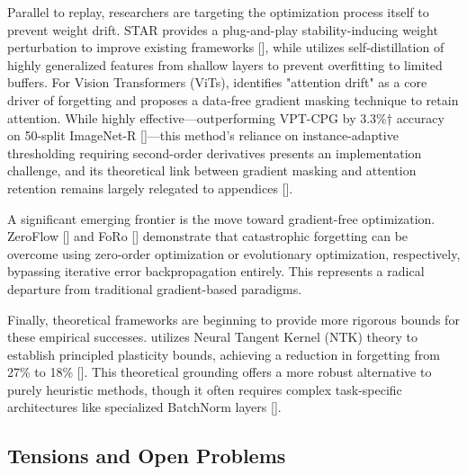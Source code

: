 \documentclass[11pt]{article}
\begin{document}
Parallel to replay, researchers are targeting the optimization process itself to prevent weight drift. STAR provides a plug-and-play stability-inducing weight perturbation to improve existing frameworks [\citep{2503.01595}], while \citep{2409.11329} utilizes self-distillation of highly generalized features from shallow layers to prevent overfitting to limited buffers. For Vision Transformers (ViTs), \citep{2602.05454} identifies "attention drift" as a core driver of forgetting and proposes a data-free gradient masking technique to retain attention. While highly effective—outperforming VPT-CPG by 3.3\%† accuracy on 50-split ImageNet-R [\citep{2602.05454}]—this method's reliance on instance-adaptive thresholding requiring second-order derivatives presents an implementation challenge, and its theoretical link between gradient masking and attention retention remains largely relegated to appendices [\citep{2602.05454}].

A significant emerging frontier is the move toward gradient-free optimization. ZeroFlow [\citep{2501.01045}] and FoRo [\citep{2509.01533}] demonstrate that catastrophic forgetting can be overcome using zero-order optimization or evolutionary optimization, respectively, bypassing iterative error backpropagation entirely. This represents a radical departure from traditional gradient-based paradigms.

Finally, theoretical frameworks are beginning to provide more rigorous bounds for these empirical successes. \citep{2511.02025} utilizes Neural Tangent Kernel (NTK) theory to establish principled plasticity bounds, achieving a reduction in forgetting from 27\% to 18\% [\citep{2511.02025}]. This theoretical grounding offers a more robust alternative to purely heuristic methods, though it often requires complex task-specific architectures like specialized BatchNorm layers [\citep{2511.02025}].

\subsection{Tensions and Open Problems}
\end{document}
